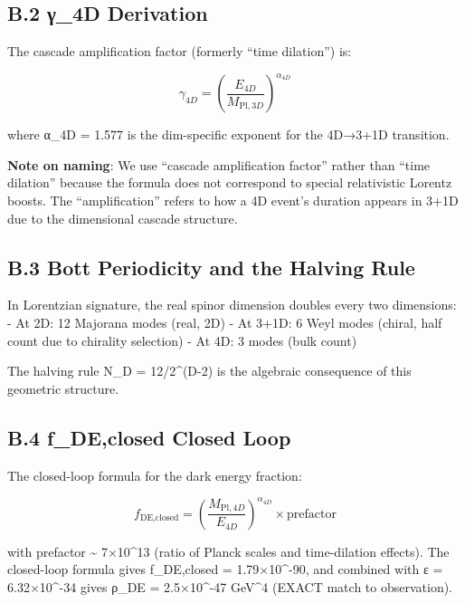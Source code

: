 \documentclass[11pt,a4paper]{article}
\begin{document}
\hypertarget{b.2-ux3b3_4d-derivation}{%
\subsection{B.2 γ\_4D Derivation}\label{b.2-ux3b3_4d-derivation}}

The cascade amplification factor (formerly ``time dilation'') is:

\[\gamma_{4D} = \left(\frac{E_{4D}}{M_{\text{Pl},3D}}\right)^{\alpha_{4D}}\]

where α\_4D = 1.577 is the dim-specific exponent for the 4D→3+1D
transition.

\textbf{Note on naming}: We use ``cascade amplification factor'' rather
than ``time dilation'' because the formula does not correspond to
special relativistic Lorentz boosts. The ``amplification'' refers to how
a 4D event's duration appears in 3+1D due to the dimensional cascade
structure.

\hypertarget{b.3-bott-periodicity-and-the-halving-rule}{%
\subsection{B.3 Bott Periodicity and the Halving
Rule}\label{b.3-bott-periodicity-and-the-halving-rule}}

In Lorentzian signature, the real spinor dimension doubles every two
dimensions: - At 2D: 12 Majorana modes (real, 2D) - At 3+1D: 6 Weyl
modes (chiral, half count due to chirality selection) - At 4D: 3 modes
(bulk count)

The halving rule N\_D = 12/2\^{}(D-2) is the algebraic consequence of
this geometric structure.

\hypertarget{b.4-f_declosed-closed-loop}{%
\subsection{B.4 f\_DE,closed Closed
Loop}\label{b.4-f_declosed-closed-loop}}

The closed-loop formula for the dark energy fraction:

\[f_{\text{DE},\text{closed}} = \left(\frac{M_{\text{Pl},4D}}{E_{4D}}\right)^{\alpha_{4D}} \times \text{prefactor}\]

with prefactor \textasciitilde{} 7×10\^{}13 (ratio of Planck scales and
time-dilation effects). The closed-loop formula gives f\_DE,closed =
1.79×10\^{}-90, and combined with ε = 6.32×10\^{}-34 gives ρ\_DE =
2.5×10\^{}-47 GeV\^{}4 (EXACT match to observation).
\end{document}
